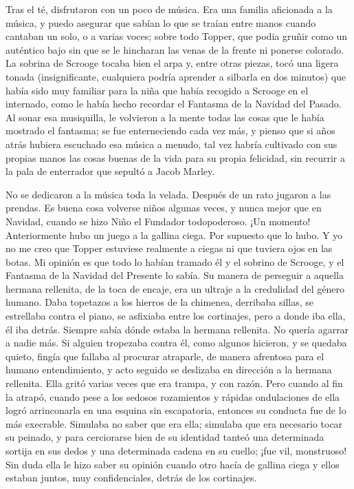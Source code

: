 \documentclass{novela}
\begin{document}
 Tras el té, disfrutaron con un poco de música. Era una familia aficionada a la música, y puedo asegurar que sabían lo que se traían entre manos cuando cantaban un solo, o a varias voces; sobre todo Topper, que podia gruñir como un auténtico bajo sin que se le hincharan las venas de la frente ni ponerse colorado. La sobrina de Scrooge tocaba bien el arpa y, entre otras piezas, tocó una ligera tonada (insignificante, cualquiera podría aprender a silbarla en dos minutos) que había sido muy familiar para la niña que había recogido a Scrooge en el internado, como le había hecho recordar el Fantasma de la Navidad del Pasado. Al sonar esa musiquilla, le volvieron a la mente todas las cosas que le había mostrado el fantasma; se fue enterneciendo cada vez más, y pienso que si años atrás hubiera escuchado esa música a menudo, tal vez habría cultivado con sus propias manos las cosas buenas de la vida para su propia felicidad, sin recurrir a la pala de enterrador que sepultó a Jacob Marley.

 No se dedicaron a la música toda la velada. Después de un rato jugaron a las prendas. Es buena cosa volverse niños algunas veces, y nunca mejor que en Navidad, cuando se hizo Niño el Fundador todopoderoso. ¡Un momento! Anteriormente hubo un juego a la gallina ciega. Por supuesto que lo hubo. Y yo no me creo que Topper estuviese realmente a ciegas ni que tuviera ojos en las botas. Mi opinión es que todo lo habían tramado él y el sobrino de Scrooge, y el Fantasma de la Navidad del Presente lo sabía. Su manera de perseguir a aquella hermana rellenita, de la toca de encaje, era un ultraje a la credulidad del género humano. Daba topetazos a los hierros de la chimenea, derribaba sillas, se estrellaba contra el piano, se asfixiaba entre los cortinajes, pero a donde iba ella, él iba detrás. Siempre sabía dónde estaba la hermana rellenita. No quería agarrar a nadie más. Si alguien tropezaba contra él, como algunos hicieron, y se quedaba quieto, fingía que fallaba al procurar atraparle, de manera afrentosa para el humano entendimiento, y acto seguido se deslizaba en dirección a la hermana rellenita. Ella gritó varias veces que era trampa, y con razón. Pero cuando al fin la atrapó, cuando pese a los sedosos rozamientos y rápidas ondulaciones de ella logró arrinconarla en una esquina sin escapatoria, entonces su conducta fue de lo más execrable. Simulaba no saber que era ella; simulaba que era necesario tocar su peinado, y para cerciorarse bien de su identidad tanteó una determinada sortija en sus dedos y una determinada cadena en su cuello; ¡fue vil, monstruoso! Sin duda ella le hizo saber su opinión cuando otro hacía de gallina ciega y ellos estaban juntos, muy confidenciales, detrás de los cortinajes.
\end{document}
